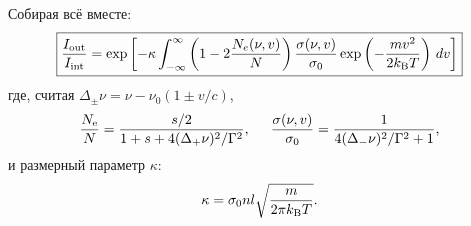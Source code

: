 Собирая всё вместе:
\begin{equation*}
\boxed{
    \frac{\sub{I}{out}}{\sub{I}{int}} = \exp\left[
        - \kappa
        \int_{-\infty}^{\infty} 
        \left(
            1 - 2 \frac{N_e (\nu, v)}{N}
        \right)
        \frac{\sigma(\nu, v)}{\sigma_0}  \exp\left(
        - \frac{m v^2}{2 \sub{k}{B} T} 
    \right) \d v
    \right]
    }
\end{equation*}
где, считая $\Delta_{\pm} \nu = \nu - \nu_0(1\pm  v /c)$,
\begin{equation*}
    \frac{\ne}{N} = \frac{s/2}{1 + s + 4 (\Delta_+ \nu)^2/\Gamma^2},
    \hspace{5 mm} 
    \frac{\sigma(\nu, v) }{\sigma_0} = \frac{1}{4 (\Delta_{-}\nu)^2 / \Gamma^2 + 1},
\end{equation*}
и размерный параметр $\kappa$:
\begin{equation*}
    \kappa = \sigma_0 n l \sqrt{\frac{m}{2 \pi \sub{k}{B} T}}.
\end{equation*}